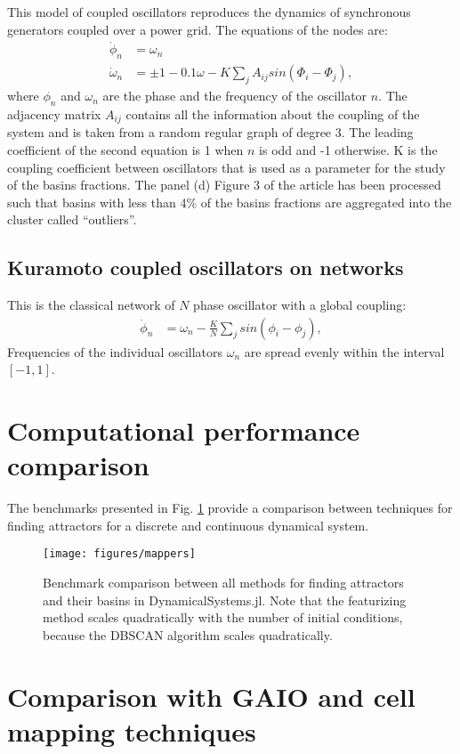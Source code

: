 \documentclass[preprint,superscriptaddress,
nofootinbib,amsmath,amssymb,aps]{revtex4-1}
\begin{document}
This model of coupled oscillators reproduces the dynamics of synchronous generators coupled over a power grid. The equations of the nodes are: 
\begin{align*}
\dot \phi_n &=  \omega_n\\
\dot \omega_n &= \pm 1 - 0.1\omega - K \sum_j A_{ij}sin(\Phi_i - \Phi_j),
\end{align*}
where $\phi_n$ and $\omega_n$ are the phase and the frequency of the oscillator $n$. The adjacency matrix $A_{ij}$ contains all the information about the coupling of the system and is taken from a random regular graph of degree 3. The leading coefficient of the second equation is 1 when $n$ is odd and -1 otherwise. K is the coupling coefficient between oscillators that is used as a parameter for the study of the basins fractions. The panel (d) Figure 3 of the article has been processed such that basins with less than 4\% of the basins fractions are aggregated into the cluster called ``outliers''. 

\subsection*{Kuramoto coupled oscillators on networks}
This is the classical network of $N$ phase oscillator with a global coupling: 
\begin{align*}
\dot \phi_n &= \omega_n - \frac{K}{N} \sum_j sin(\phi_i - \phi_j),
\end{align*}
Frequencies of the individual oscillators $\omega_n$ are spread evenly within the interval $[-1, 1]$. 

\section{Computational performance comparison}
The benchmarks presented in Fig. \ref{fig:benchmarks} provide a comparison between techniques for finding attractors for a discrete and continuous dynamical system.
\begin{figure}[!h]
    \centering
    \texttt{[image: figures/mappers]}
    \caption{Benchmark comparison between all methods for finding attractors and their basins in DynamicalSystems.jl. Note that the featurizing method scales quadratically with the number of initial conditions, because the DBSCAN algorithm scales quadratically.}
    \label{fig:benchmarks}
\end{figure}

\section{Comparison with GAIO and cell mapping techniques} 
\end{document}
